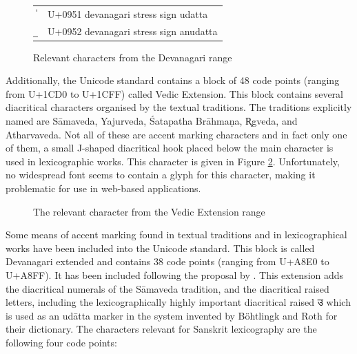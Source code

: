\begin{figure}[ht]
\begin{center}
\begin{tabular}{ll}
  {\devfont 	॑}& U+0951 {\sc devanagari stress sign udatta}\\
  {\devfont 	॒}& U+0952 {\sc devanagari stress sign anudatta}
\end{tabular}
\end{center}
\caption[Relevant characters from the Devanagari range]{\label{tab:unidev}Relevant characters from the Devanagari range}
\end{figure}

Additionally, the Unicode standard contains a block of 48 code points (ranging from U+1CD0 to U+1CFF) called Vedic Extension. This block contains several diacritical characters organised by the textual traditions. The traditions explicitly named are Sāmaveda, Yajurveda, Śatapatha Brāhmaṇa, R̥gveda, and Atharvaveda. Not all of these are accent marking characters and in fact only one of them, a small J-shaped diacritical hook placed below the main character is used in lexicographic works. This character is given in Figure \ref{fig:j-shape}. Unfortunately, no widespread font seems to contain a glyph for this character, making it problematic for use in web-based applications.

\begin{figure}[!ht]
\begin{center}
\end{center}
\caption[The relevant character from the Vedic Extension range]{\label{fig:j-shape}The relevant character from the Vedic Extension range}
\end{figure}

Some means of accent marking found in textual traditions and in lexicographical works have been included into the Unicode standard. This block is called Devanagari extended and contains 38 code points (ranging from U+A8E0 to U+A8FF). It has been included following the proposal by \citet{EversonScharf2007}. This extension adds the diacritical numerals of the Sāmaveda tradition, and the diacritical raised letters, including the lexicographically highly important diacritical raised {\devfont उ} which is used as an udātta marker in the system invented by Böhtlingk and Roth for their dictionary. The characters relevant for Sanskrit lexicography are the following four code points:

